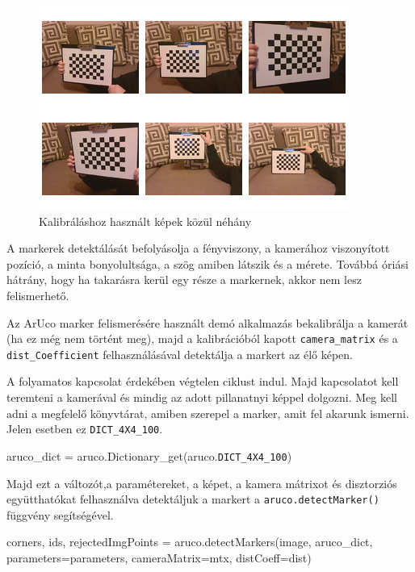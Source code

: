 \begin{figure}[htp]
    \centering
   	\includegraphics[width=7truecm, height=6truecm]{images/calibration.jpg}
	\caption{Kalibráláshoz használt képek közül néhány}
\end{figure}


A markerek detektálását befolyásolja a fényviszony, a kamerához viszonyított pozíció, a minta bonyolultsága, a szög amiben látszik és a mérete. Továbbá óriási hátrány, hogy ha takarásra kerül egy része a markernek, akkor nem lesz felismerhető.

Az ArUco marker felismerésére használt demó alkalmazás bekalibrálja a kamerát (ha ez még nem történt meg), majd a kalibrációból kapott \texttt{camera\_matrix} és a \texttt{dist\_Coefficient} felhasználásával detektálja a markert az élő képen.

A folyamatos kapcsolat érdekében végtelen ciklust indul. Majd kapcsolatot kell teremteni a kamerával és mindig az adott pillanatnyi képpel dolgozni. 
Meg kell adni a megfelelő könyvtárat, amiben szerepel a marker, amit fel akarunk ismerni. Jelen esetben ez  \texttt{DICT\_4X4\_100}.
\begin{python}
aruco_dict = aruco.Dictionary_get(aruco.\texttt{DICT\_4X4\_100})
\end{python}

Majd ezt a változót,a paramétereket, a képet, a kamera mátrixot és disztorziós együtthatókat felhasználva detektáljuk a markert a \texttt{aruco.detectMarker()} függvény segítségével.

\begin{python}
corners, ids, rejectedImgPoints = aruco.detectMarkers(image, aruco_dict,
parameters=parameters,
cameraMatrix=mtx,
distCoeff=dist)
\end{python}

